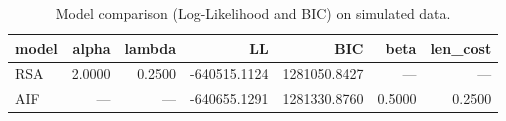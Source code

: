 \begin{table}[!ht]
\centering
\begin{table}
\caption{Model comparison (Log-Likelihood and BIC) on simulated data.}
\label{tab:fig02}
\begin{tabular}{lrrrrrr}
\toprule
model & alpha & lambda & LL & BIC & beta & len\_cost \\
\midrule
RSA & 2.0000 & 0.2500 & -640515.1124 & 1281050.8427 & --- & --- \\
AIF & --- & --- & -640655.1291 & 1281330.8760 & 0.5000 & 0.2500 \\
\bottomrule
\end{tabular}
\end{table}
\end{table}
